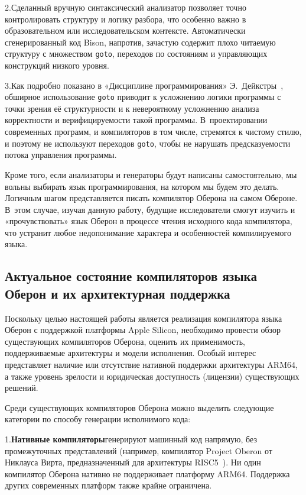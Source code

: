 \documentclass[utf8]{lgu}
\newcommand{\tire}{\unskip\nobreak\thinspace\textemdash\thinspace}
\newcommand{\code}[1]{{\normalsize\texttt{#1}}}
\begin{document}
2.\hspace{0.5em}Сделанный вручную синтаксический анализатор позволяет точно контролировать структуру и логику разбора, что особенно важно в образовательном или исследовательском контексте. Автоматически сгенерированный код Bison, напротив, зачастую содержит плохо читаемую структуру с множеством \code{goto}, переходов по состояниям и управляющих конструкций низкого уровня.

3.\hspace{0.5em}Как подробно показано в «Дисциплине программирования» Э.~Дейкстры~\cite{Discip}, обширное использование \code{goto} приводит к усложнению логики программы с точки зрения её структурности и к невероятному усложнению анализа корректности и верифицируемости такой программы. В~проектировании современных программ, и компиляторов в том числе, стремятся к чистому стилю, и поэтому не используют переходов \code{goto}, чтобы не нарушать предсказуемости потока управления программы.

Кроме того, если анализаторы и генераторы будут написаны самостоятельно, мы вольны выбирать язык программирования, на котором мы будем это делать. Логичным шагом представляется писать компилятор Оберона на самом Обероне. В~этом случае, изучая данную работу, будущие исследователи смогут изучить и «прочувствовать» язык Оберон в процессе чтения исходного кода компилятора, что устранит любое недопонимание характера и особенностей компилируемого языка.

\subsection{Актуальное состояние компиляторов языка Оберон и их архитектурная поддержка}

\firstparskip Поскольку целью настоящей работы является реализация компилятора языка Оберон с поддержкой платформы Apple Silicon, необходимо провести обзор существующих компиляторов Оберона, оценить их применимость, поддерживаемые архитектуры и модели исполнения. Особый интерес представляет наличие или отсутствие нативной поддержки архитектуры ARM64, а также уровень зрелости и юридическая доступность (лицензии) существующих решений.

Среди существующих компиляторов Оберона можно выделить следующие категории по способу генерации исполнимого кода:

1.\hspace{0.5em}\textbf{Нативные компиляторы}\tire генерируют машинный код напрямую, без промежуточных представлений (например, компилятор Project Oberon от Никлауса Вирта, предназначенный для архитектуры RISC5~\cite{WirthRISC}). Ни один компилятор Оберона нативно не поддерживает платформу ARM64. Поддержка других современных платформ также крайне ограничена.
\end{document}
